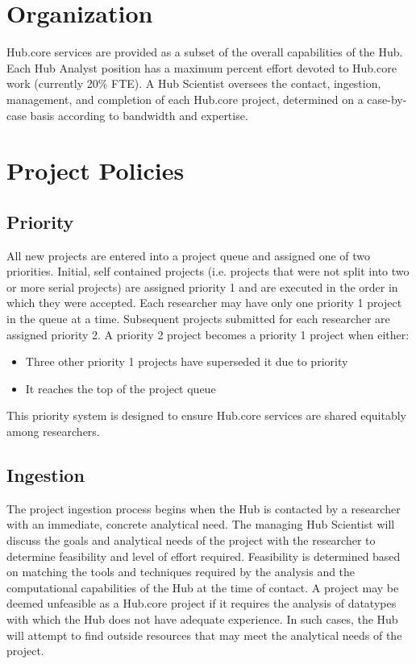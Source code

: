 \documentclass[fleqn,10pt]{wlscirep}
\begin{document}
\section{Organization}

Hub.core services are provided as a subset of the overall capabilities of the Hub.
Each Hub Analyst position has a maximum percent effort devoted to Hub.core work (currently 20\% FTE).
A Hub Scientist oversees the contact, ingestion, management, and completion of each Hub.core project, determined on a case-by-case basis according to bandwidth and expertise.

\section{Project Policies}

\subsection{Priority}

All new projects are entered into a project queue and assigned one of two priorities.
Initial, self contained projects (i.e. projects that were not split into two or more serial projects) are assigned priority 1 and are executed in the order in which they were accepted.
Each researcher may have only one priority 1 project in the queue at a time.
Subsequent projects submitted for each researcher are assigned priority 2.
A priority 2 project becomes a priority 1 project when either:

\begin{itemize}
    \item Three other priority 1 projects have superseded it due to priority
    \item It reaches the top of the project queue
\end{itemize}
This priority system is designed to ensure Hub.core services are shared equitably among researchers.

\subsection{Ingestion}

The project ingestion process begins when the Hub is contacted by a researcher with an immediate, concrete analytical need.
The managing Hub Scientist will discuss the goals and analytical needs of the project with the researcher to determine feasibility and level of effort required.
Feasibility is determined based on matching the tools and techniques required by the analysis and the computational capabilities of the Hub at the time of contact.
A project may be deemed unfeasible as a Hub.core project if it requires the analysis of datatypes with which the Hub does not have adequate experience.
In such cases, the Hub will attempt to find outside resources that may meet the analytical needs of the project.
\end{document}
